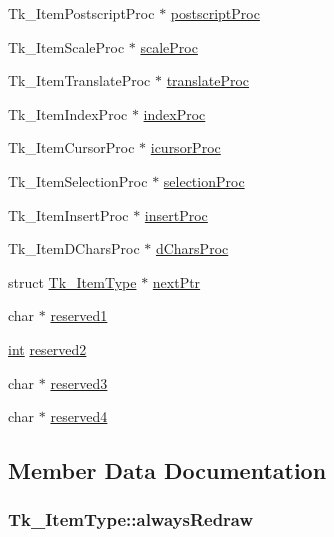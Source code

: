 \begin{DoxyCompactItemize}
Tk\+\_\+\+Item\+Postscript\+Proc $\ast$ \hyperlink{struct_tk___item_type_afc66dbfd50afc93a61a097ff1b942530}{postscript\+Proc}
\item 
Tk\+\_\+\+Item\+Scale\+Proc $\ast$ \hyperlink{struct_tk___item_type_a7ff690ba7376afe6202e9706eff28345}{scale\+Proc}
\item 
Tk\+\_\+\+Item\+Translate\+Proc $\ast$ \hyperlink{struct_tk___item_type_abf1eac491b529a71298b1ee73f6dd62f}{translate\+Proc}
\item 
Tk\+\_\+\+Item\+Index\+Proc $\ast$ \hyperlink{struct_tk___item_type_a8327e1bd75455037969fdcd63c89dd5a}{index\+Proc}
\item 
Tk\+\_\+\+Item\+Cursor\+Proc $\ast$ \hyperlink{struct_tk___item_type_a14050f95d3ef78401c92afb2d616416a}{icursor\+Proc}
\item 
Tk\+\_\+\+Item\+Selection\+Proc $\ast$ \hyperlink{struct_tk___item_type_ac643afb8df2a00d9ab157ae40c6bfbe6}{selection\+Proc}
\item 
Tk\+\_\+\+Item\+Insert\+Proc $\ast$ \hyperlink{struct_tk___item_type_a955d4a622d1f9fd2a6e365b3aa89289c}{insert\+Proc}
\item 
Tk\+\_\+\+Item\+D\+Chars\+Proc $\ast$ \hyperlink{struct_tk___item_type_ad558970c5aa8276ef6a0c7e3b0360723}{d\+Chars\+Proc}
\item 
struct \hyperlink{struct_tk___item_type}{Tk\+\_\+\+Item\+Type} $\ast$ \hyperlink{struct_tk___item_type_a971280f7d5299cf8c43e2fa343b57b3b}{next\+Ptr}
\item 
char $\ast$ \hyperlink{struct_tk___item_type_afa36a3c3c1e14b426482d6f07d05fe7f}{reserved1}
\item 
\hyperlink{tk_8h_a83f82f76e7fed06f4c49d2db94028a6d}{int} \hyperlink{struct_tk___item_type_a360bb68ffba4fec3daee44194fd48ede}{reserved2}
\item 
char $\ast$ \hyperlink{struct_tk___item_type_ac1941c0ea1d2657068c60dcb7fa71d35}{reserved3}
\item 
char $\ast$ \hyperlink{struct_tk___item_type_a45856e8d3d31e75f8e3f9fd8d18f1871}{reserved4}
\end{DoxyCompactItemize}


\subsection{Member Data Documentation}
\subsubsection[{\texorpdfstring{always\+Redraw}{alwaysRedraw}}]{ Tk\+\_\+\+Item\+Type\+::always\+Redraw}\hypertarget{struct_tk___item_type_a8da252dbcc6a33571a750bbdce75eb4b}{}\label{struct_tk___item_type_a8da252dbcc6a33571a750bbdce75eb4b}

